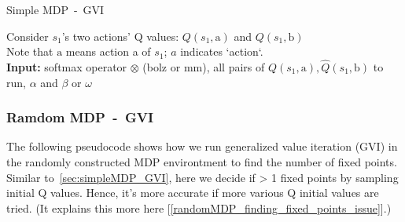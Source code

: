 \begin{algorithm}
    \caption{Simple MDP\ -\ GVI}\label{alg:SimpleMDP-GVI}
    Consider $s_1$'s two actions' Q values: $Q(s_1,\text{a})$ and $Q(s_1,\text{b})$\\
    Note that $\text{a}$ means action a of $s_1$; $a$ indicates `action`.\\
    \textbf{Input:} softmax operator $\otimes$ (bolz or mm), all pairs of $Q(s_1,\text{a}),\hat{Q}(s_1,\text{b})$ to run, $\alpha$ and $\beta$ or $\omega$
    \begin{algorithmic}[1]
          
            \Repeat{}
                \EndFor{}
        \EndFor{}
        \Else{}
        \EndIf{}
    \end{algorithmic}
\end{algorithm}


\subsubsection{Ramdom MDP\ -\ GVI}

The following pseudocode shows how we run generalized value iteration (GVI) in the randomly constructed MDP environtment to find the number of fixed points.
Similar to\ \ref{sec:simpleMDP_GVI}, here we decide if > 1 fixed points by sampling initial Q values.
Hence, it's more accurate if more various Q initial values are tried.
(It explains this more here [\ref{randomMDP_finding_fixed_points_issue}].)

